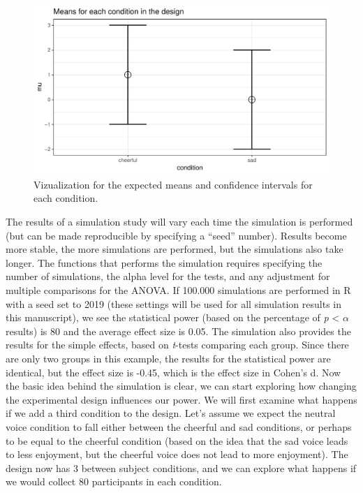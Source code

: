 \documentclass[,man,floatsintext]{apa6}
\begin{document}
\begin{figure}
\centering
\includegraphics{0.1_Simulation_Based_Power_Analysis_For_Factorial_ANOVA_Designs_files/figure-latex/mean-plot-1.pdf}
\caption{\label{fig:mean-plot}Vizualization for the expected means and
confidence intervals for each condition.}
\end{figure}

The results of a simulation study will vary each time the simulation is
performed (but can be made reproducible by specifying a \enquote{seed}
number). Results become more stable, the more simulations are performed,
but the simulations also take longer. The functions that performs the
simulation requires specifying the number of simulations, the alpha
level for the tests, and any adjustment for multiple comparisons for the
ANOVA. If 100.000 simulations are performed in R with a seed set to 2019
(these settings will be used for all simulation results in this
manuscript), we see the statistical power (based on the percentage of
\emph{p} \textless{} \(\alpha\) results) is 80 and the average effect
size is 0.05. The simulation also provides the results for the simple
effects, based on \emph{t}-tests comparing each group. Since there are
only two groups in this example, the results for the statistical power
are identical, but the effect size is -0.45, which is the effect size in
Cohen's d. Now the basic idea behind the simulation is clear, we can
start exploring how changing the experimental design influences our
power. We will first examine what happens if we add a third condition to
the design. Let's assume we expect the neutral voice condition to fall
either between the cheerful and sad conditions, or perhaps to be equal
to the cheerful condition (based on the idea that the sad voice leads to
less enjoyment, but the cheerful voice does not lead to more enjoyment).
The design now has 3 between subject conditions, and we can explore what
happens if we would collect 80 participants in each condition.
\end{document}
